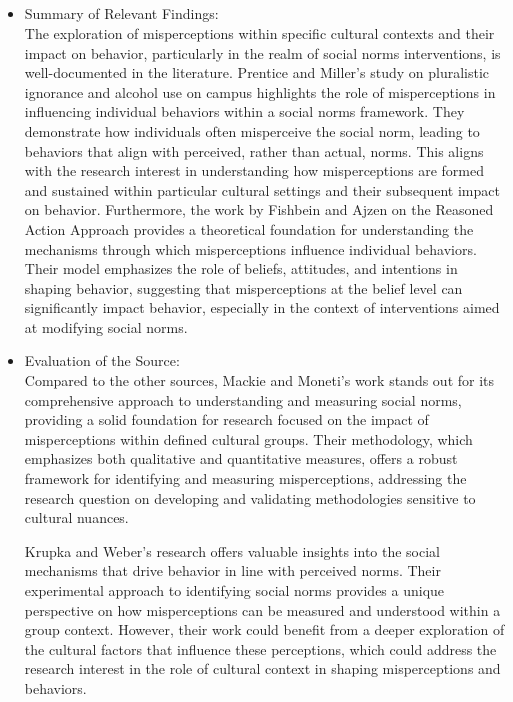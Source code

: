 \documentclass{article}
\begin{document}
\subsection{}
\begin{itemize}
    \item Summary of Relevant Findings:\\
The exploration of misperceptions within specific cultural contexts and their impact on behavior, particularly in the realm of social norms interventions, is well-documented in the literature. Prentice and Miller's study on pluralistic ignorance and alcohol use on campus highlights the role of misperceptions in influencing individual behaviors within a social norms framework. They demonstrate how individuals often misperceive the social norm, leading to behaviors that align with perceived, rather than actual, norms. This aligns with the research interest in understanding how misperceptions are formed and sustained within particular cultural settings and their subsequent impact on behavior. Furthermore, the work by Fishbein and Ajzen on the Reasoned Action Approach provides a theoretical foundation for understanding the mechanisms through which misperceptions influence individual behaviors. Their model emphasizes the role of beliefs, attitudes, and intentions in shaping behavior, suggesting that misperceptions at the belief level can significantly impact behavior, especially in the context of interventions aimed at modifying social norms.
\end{itemize}
\begin{itemize}
    \item Evaluation of the Source:\\
Compared to the other sources, Mackie and Moneti's work stands out for its comprehensive approach to understanding and measuring social norms, providing a solid foundation for research focused on the impact of misperceptions within defined cultural groups. Their methodology, which emphasizes both qualitative and quantitative measures, offers a robust framework for identifying and measuring misperceptions, addressing the research question on developing and validating methodologies sensitive to cultural nuances.

Krupka and Weber's research offers valuable insights into the social mechanisms that drive behavior in line with perceived norms. Their experimental approach to identifying social norms provides a unique perspective on how misperceptions can be measured and understood within a group context. However, their work could benefit from a deeper exploration of the cultural factors that influence these perceptions, which could address the research interest in the role of cultural context in shaping misperceptions and behaviors.
\end{itemize}

\printbibliography
\end{document}
